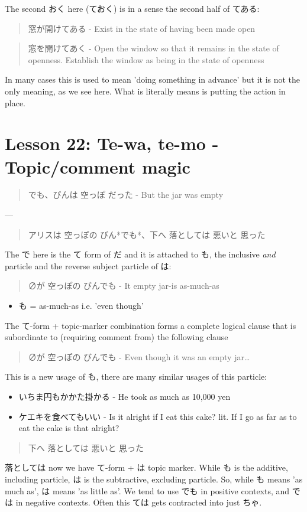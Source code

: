 \documentclass[11pt]{article}
\begin{document}
The second おく here (ておく) is in a sense the second half of てある:
\begin{quote}
窓が開けてある - Exist in the state of having been made open
\end{quote}
\begin{quote}
窓を開けてあく - Open the window so that it remains in the state of openness. Establish the window as being in the state of openness
\end{quote}
In many cases this is used to mean 'doing something in advance' but it is not the only meaning, as we see here. What is literally means is putting the action in place.
\section{Lesson 22: Te-wa, te-mo - Topic/comment magic}
\label{sec:orgf1d3e40}
\begin{quote}
でも、びんは 空っぽ だった - But the jar was empty
\end{quote}
---
\begin{quote}
アリスは 空っぽの びん*でも*、下へ 落としては 悪いと 思った
\end{quote}
The で here is the て form of だ and it is attached to も, the inclusive \emph{and} particle and the reverse subject particle of は:
\begin{quote}
∅が 空っぽの びんでも - It empty jar-is as-much-as
\end{quote}
\begin{itemize}
\item も = as-much-as i.e. 'even though'
\end{itemize}
The て-form + topic-marker combination forms a complete logical clause that is subordinate to (requiring comment from) the following clause
\begin{quote}
∅が 空っぽの びんでも - Even though it was an empty jar\ldots{}
\end{quote}

This is a new usage of も, there are many similar usages of this particle:
\begin{itemize}
\item いちま円もかかた掛かる - He took as much as 10,000 yen
\item ケエキを食べてもいい - Is it alright if I eat this cake? lit. If I go as far as to eat the cake is that alright?
\end{itemize}

\begin{quote}
下へ 落としては 悪いと 思った
\end{quote}
落としては now we have て-form + は topic marker. While も is the additive, including particle, は is the subtractive, excluding particle. So, while も means 'as much as', は means 'as little as'. We tend to use でも in positive contexts, and では in negative contexts. Often this ては gets contracted into just ちゃ.
\end{document}
